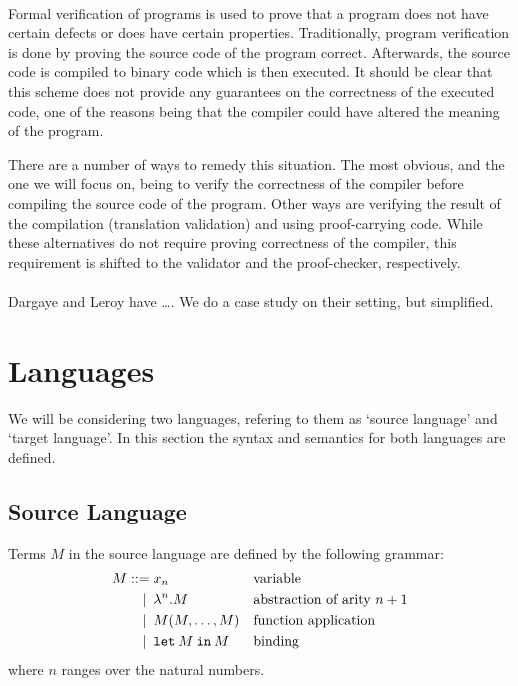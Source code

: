 \documentclass[a4paper,11pt,draft]{article}
\newcommand{\kw}[1]{\mathtt{#1}}
\begin{document}
\paragraph{}

Formal verification of programs is used to prove that a program does not have certain
defects or does have certain properties. Traditionally, program verification is done
by proving the source code of the program correct. Afterwards, the source code is
compiled to binary code which is then executed. It should be clear that this scheme
does not provide any guarantees on the correctness of the executed code, one of the
reasons being that the compiler could have altered the meaning of the program.

There are a number of ways to remedy this situation. The most obvious, and the one we
will focus on, being to verify the correctness of the compiler before compiling the
source code of the program. Other ways are verifying the result of the compilation
(translation validation) and using proof-carrying code. While these alternatives do
not require proving correctness of the compiler, this requirement is shifted to the
validator and the proof-checker, respectively.

\paragraph{}


Dargaye and Leroy
\cite{Dargaye-Leroy-07} have \ldots. We do a case study on their setting, but
simplified.


\section{Languages}\label{sec:languages}

We will be considering two languages, refering to them as `source language' and
`target language'. In this section the syntax and semantics for both languages
are defined.

\subsection{Source Language}

Terms $M$ in the source language are defined by the following grammar:
\begin{align*}
M ::=             &\; x_{n}
                  && \text{variable} \\
\llap{\textbar\:} &\; \lambda^{n}.M
                  && \text{abstraction of arity $n+1$} \\
\llap{\textbar\:} &\; M(M, \ldots, M)
                  && \text{function application} \\
\llap{\textbar\:} &\; \kw{let} \: M \: \kw{in} \: M
                  && \text{binding}
\end{align*}
where $n$ ranges over the natural numbers.
\end{document}
